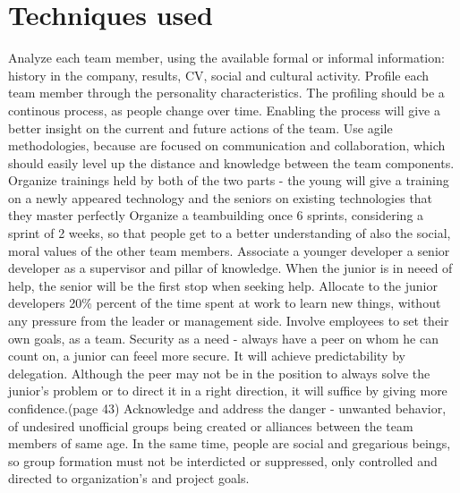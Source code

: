 \documentclass[conference]{IEEEtran}
\begin{document}
\section{Techniques used}
Analyze each team member, using the available formal or informal information: history in the company, results, CV, social and cultural activity. Profile each team member through the personality characteristics. The profiling should be a continous process, as people change over time. Enabling the process will give a better insight on the current and future actions of the team.
\newline\indent
Use agile methodologies, because are focused on communication and collaboration, which should easily level up the distance and knowledge between the team components.
\newline\indent
Organize trainings held by both of the two parts - the young will give a training on a newly appeared technology and the seniors on existing technologies that they master perfectly
\newline\indent
Organize a teambuilding once 6 sprints, considering a sprint of 2 weeks, so that people get to a better understanding of also the social, moral values of the other team members.
\newline\indent
Associate a younger developer a senior developer as a supervisor and pillar of knowledge. When the junior is in neeed of help, the senior will be the first stop when seeking help.
\newline\indent
Allocate to the junior developers 20\% percent of the time spent at work to learn new things, without any pressure from the leader or management side.
\newline\indent
Involve employees to set their own goals, as a team.
\newline\indent
Security as a need - always have a peer on whom he can count on, a junior can feeel more secure. It will achieve predictability by delegation. Although the peer may not be in the position to always solve the junior's problem or to direct it in a right direction, it will suffice by giving more confidence.(page 43)
\newline\indent
Acknowledge and address the danger - unwanted behavior, of undesired unofficial groups being created or alliances between the team members of same age. In the same time, people are social and gregarious beings, so group formation must not be interdicted or suppressed, only controlled and directed to organization's and project goals.
\newline\indent
\end{document}
